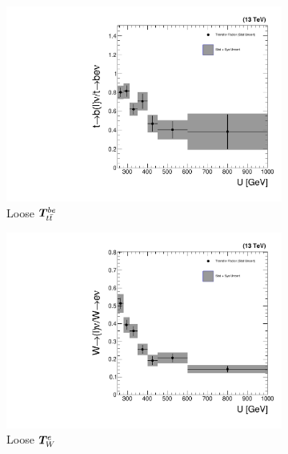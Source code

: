 \begin{figure}[]
    \begin{center}
        \begin{subfigure}[t]{0.32\textwidth}
            \includegraphics[width=\textwidth]{figures/monotop/xfer/rfactor_singleelectrontop_loose.pdf}
            \caption{Loose $\bm{T}^{be}_{t\bar{t}}$}
        \end{subfigure}
        \begin{subfigure}[t]{0.32\textwidth}
            \includegraphics[width=\textwidth]{figures/monotop/xfer/rfactor_singleelectronw_loose.pdf}
            \caption{Loose $\bm{T}^{e}_{W}$}
        \end{subfigure}
        \begin{subfigure}[t]{0.32\textwidth}

\end{subfigure}
\end{center}
\end{figure}
